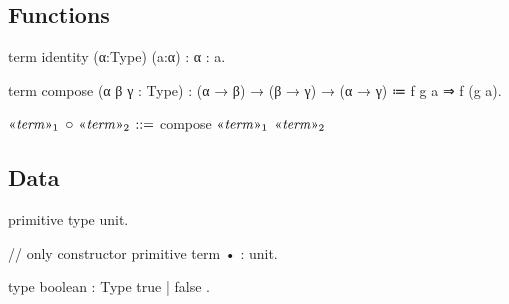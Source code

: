 \section{\LangA}

\subsection{Functions}

\begin{program}
term identity (α:Type) (a:α) : α : a.

term compose (α β γ : Type)
  : (α → β) → (β → γ) → (α → γ)
  ≔ f g a ⇒ f (g a).
\end{program}

\begin{notation}[caption={Notation for \code|compose|}]
$\mvar{term}_1$ ○ $\mvar{term}_2$   $\syneq$   compose $\mvar{term}_1$ $\mvar{term}_2$
\end{notation}

\subsection{Data}

\begin{program}[caption={unit}]
primitive type unit.

// only constructor
primitive term • : unit.
\end{program}


\begin{program}[caption={boolean}]
type boolean : Type { true | false }.
\end{program}

\begin{notational}[caption={Notation for conditional}]
if $\mvar{term}_1$ then $\mvar{term}_2$ else $\mvar{term}_3$
  $\syneq$
    cases $\mvar{term}_1$ { true  ⇒ $\mvar{term}_2$
                          | false ⇒ $\mvar{term}_3$
\end{notational}


